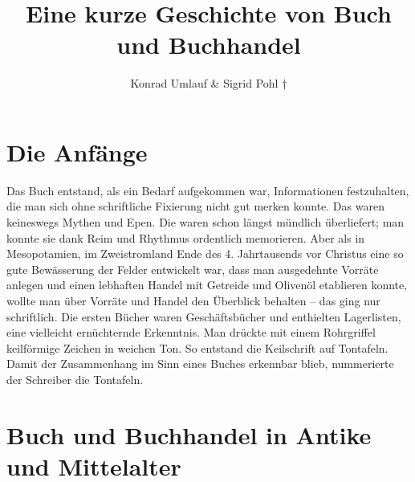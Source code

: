 \documentclass[a4paper,
fontsize=11pt,
oneside,
numbers=noperiodatend,
parskip=half-,
bibliography=totoc,
final
]{scrartcl}
\title{\LARGE{Eine kurze Geschichte von Buch und Buchhandel
}}%
\author{Konrad Umlauf \& Sigrid Pohl †} %
\date{}
\begin{document}
\maketitle
\thispagestyle{fancyplain} 


\hypertarget{die-anfuxe4nge}{%
\section{Die Anfänge}\label{die-anfuxe4nge}}

Das Buch entstand, als ein Bedarf aufgekommen war, Informationen
festzuhalten, die man sich ohne schriftliche Fixierung nicht gut merken
konnte. Das waren keineswegs Mythen und Epen. Die waren schon längst
mündlich überliefert; man konnte sie dank Reim und Rhythmus ordentlich
memorieren. Aber als in Mesopotamien, im Zweistromland Ende des 4.
Jahrtausends vor Christus eine so gute Bewässerung der Felder entwickelt
war, dass man ausgedehnte Vorräte anlegen und einen lebhaften Handel mit
Getreide und Olivenöl etablieren konnte, wollte man über Vorräte und
Handel den Überblick behalten -- das ging nur schriftlich. Die ersten
Bücher waren Geschäftsbücher und enthielten Lagerlisten, eine vielleicht
ernüchternde Erkenntnis. Man drückte mit einem Rohrgriffel keilförmige
Zeichen in weichen Ton. So entstand die Keilschrift auf Tontafeln. Damit
der Zusammenhang im Sinn eines Buches erkennbar blieb, nummerierte der
Schreiber die Tontafeln.

\begin{center}
\end{center}

\hypertarget{buch-und-buchhandel-in-antike-und-mittelalter}{%
\section{Buch und Buchhandel in Antike und
Mittelalter}\label{buch-und-buchhandel-in-antike-und-mittelalter}}
\end{document}

